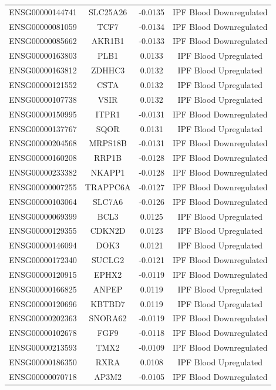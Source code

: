 \documentclass[
]{article}
\begin{document}
\begin{singlespace}
\begin{longtable}[t]{lccc}
ENSG00000144741 & SLC25A26 & -0.0135 & IPF Blood Downregulated\\
\addlinespace
ENSG00000081059 & TCF7 & -0.0134 & IPF Blood Downregulated\\
ENSG00000085662 & AKR1B1 & -0.0133 & IPF Blood Downregulated\\
ENSG00000163803 & PLB1 & 0.0133 & IPF Blood Upregulated\\
ENSG00000163812 & ZDHHC3 & 0.0132 & IPF Blood Upregulated\\
ENSG00000121552 & CSTA & 0.0132 & IPF Blood Upregulated\\
\addlinespace
ENSG00000107738 & VSIR & 0.0132 & IPF Blood Upregulated\\
ENSG00000150995 & ITPR1 & -0.0131 & IPF Blood Downregulated\\
ENSG00000137767 & SQOR & 0.0131 & IPF Blood Upregulated\\
ENSG00000204568 & MRPS18B & -0.0131 & IPF Blood Downregulated\\
ENSG00000160208 & RRP1B & -0.0128 & IPF Blood Downregulated\\
\addlinespace
ENSG00000233382 & NKAPP1 & -0.0128 & IPF Blood Downregulated\\
ENSG00000007255 & TRAPPC6A & -0.0127 & IPF Blood Downregulated\\
ENSG00000103064 & SLC7A6 & -0.0126 & IPF Blood Downregulated\\
ENSG00000069399 & BCL3 & 0.0125 & IPF Blood Upregulated\\
ENSG00000129355 & CDKN2D & 0.0123 & IPF Blood Upregulated\\
\addlinespace
ENSG00000146094 & DOK3 & 0.0121 & IPF Blood Upregulated\\
ENSG00000172340 & SUCLG2 & -0.0121 & IPF Blood Downregulated\\
ENSG00000120915 & EPHX2 & -0.0119 & IPF Blood Downregulated\\
ENSG00000166825 & ANPEP & 0.0119 & IPF Blood Upregulated\\
ENSG00000120696 & KBTBD7 & 0.0119 & IPF Blood Upregulated\\
\addlinespace
ENSG00000202363 & SNORA62 & -0.0119 & IPF Blood Downregulated\\
ENSG00000102678 & FGF9 & -0.0118 & IPF Blood Downregulated\\
ENSG00000213593 & TMX2 & -0.0109 & IPF Blood Downregulated\\
ENSG00000186350 & RXRA & 0.0108 & IPF Blood Upregulated\\
ENSG00000070718 & AP3M2 & -0.0105 & IPF Blood Downregulated\\

\end{longtable}
\end{singlespace}
\end{document}
